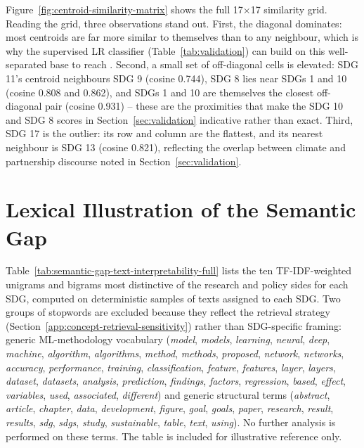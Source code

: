 \documentclass[12pt,a4paper]{article}
\let\OldSection\section
\renewcommand{\section}{\clearpage\FloatBarrier\OldSection}
\begin{document}
Figure~\ref{fig:centroid-similarity-matrix} shows the full 17$\times$17 similarity grid. Reading the grid, three observations stand out. First, the diagonal dominates: most centroids are far more similar to themselves than to any neighbour, which is why the supervised LR classifier (Table~\ref{tab:validation}) can build on this well-separated base to reach \MacroFOne{}. Second, a small set of off-diagonal cells is elevated: SDG 11's centroid neighbours SDG 9 (cosine 0.744), SDG 8 lies near SDGs 1 and 10 (cosine 0.808{} and 0.862), and SDGs 1 and 10 are themselves the closest off-diagonal pair (cosine 0.931) -- these are the proximities that make the SDG 10 and SDG 8 scores in Section~\ref{sec:validation} indicative rather than exact. Third, SDG 17 is the outlier: its row and column are the flattest, and its nearest neighbour is SDG 13 (cosine 0.821), reflecting the overlap between climate and partnership discourse noted in Section~\ref{sec:validation}.

\section{Lexical Illustration of the Semantic Gap}
\label{app:semantic-gap-text-interpretability}

Table~\ref{tab:semantic-gap-text-interpretability-full} lists the ten TF-IDF-weighted unigrams and bigrams most distinctive of the research and policy sides for each SDG, computed on deterministic samples of texts assigned to each SDG. Two groups of stopwords are excluded because they reflect the retrieval strategy (Section~\ref{app:concept-retrieval-sensitivity}) rather than SDG-specific framing: generic ML-methodology vocabulary (\textit{model}, \textit{models}, \textit{learning}, \textit{neural}, \textit{deep}, \textit{machine}, \textit{algorithm}, \textit{algorithms}, \textit{method}, \textit{methods}, \textit{proposed}, \textit{network}, \textit{networks}, \textit{accuracy}, \textit{performance}, \textit{training}, \textit{classification}, \textit{feature}, \textit{features}, \textit{layer}, \textit{layers}, \textit{dataset}, \textit{datasets}, \textit{analysis}, \textit{prediction}, \textit{findings}, \textit{factors}, \textit{regression}, \textit{based}, \textit{effect}, \textit{variables}, \textit{used}, \textit{associated}, \textit{different}) and generic structural terms (\textit{abstract}, \textit{article}, \textit{chapter}, \textit{data}, \textit{development}, \textit{figure}, \textit{goal}, \textit{goals}, \textit{paper}, \textit{research}, \textit{result}, \textit{results}, \textit{sdg}, \textit{sdgs}, \textit{study}, \textit{sustainable}, \textit{table}, \textit{text}, \textit{using}). No further analysis is performed on these terms. The table is included for illustrative reference only.
\end{document}
